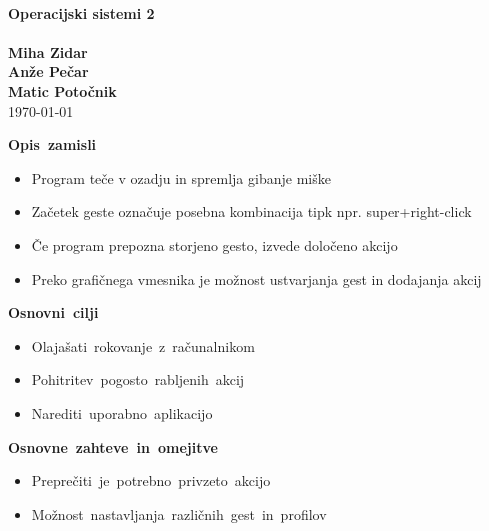 \documentclass[10pt,landscape,a4paper,oneside]{article}
\newenvironment{items}{
\begin{itemize}
	\setlength{\itemsep}{2pt}
	\setlength{\parskip}{0pt}
	\setlength{\parsep}{0pt}
	\setlength{\topsep}{0pt}
}{\end{itemize}}
\begin{document}
\begin{titlepage}
\begin{center}
\ \\[1cm]
{\Huge\bf Operacijski sistemi 2}\\[1cm]
{}\\[2cm]
{\Large\bf Miha Zidar}\\[0.5cm]
{\Large\bf Anže Pečar}\\[0.5cm]
{\Large\bf Matic Potočnik}\\[2cm]

{\huge \today}\ \\[1.55cm]

\end{center}
\end{titlepage}
\pagebreak
\begin{center}
	\Huge\mbox{\bf Opis zamisli}\\[2cm]
	\begin{items}
	\item Program teče v ozadju in spremlja gibanje miške
	\item Začetek geste označuje posebna kombinacija tipk npr. super+right-click
	\item Če program prepozna storjeno gesto, izvede določeno akcijo
	\item Preko grafičnega vmesnika je možnost ustvarjanja gest in dodajanja akcij
	\end{items}
\end{center}
\pagebreak
\begin{center}
	\Huge\mbox{\bf Osnovni cilji}\\[2cm]
	\begin{items}
	\item \mbox{Olajašati rokovanje z računalnikom}
	\item \mbox{Pohitritev pogosto rabljenih akcij}
	\item \mbox{Narediti uporabno aplikacijo}
	\end{items}
\end{center}
\begin{center}
	\Huge\mbox{\bf Osnovne zahteve in omejitve}\\[2cm]
	\begin{items}
	\item \mbox{Preprečiti je potrebno privzeto akcijo}
	\item \mbox{Možnost nastavljanja različnih gest in profilov}
	\end{items}
\end{center}
\end{document}
